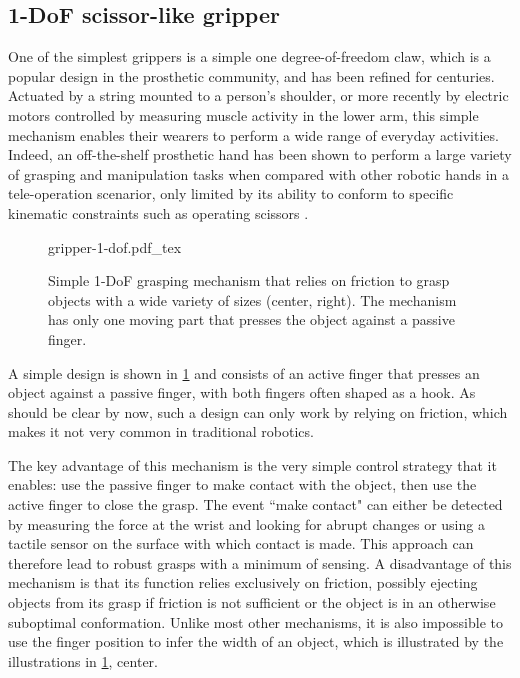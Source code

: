 \subsection{1-DoF scissor-like gripper}
One of the simplest grippers is a simple one degree-of-freedom claw, which is a popular design in the prosthetic community, and has been refined for centuries. Actuated by a string mounted to a person's shoulder, or more recently by electric motors controlled by measuring muscle activity in the lower arm, this simple mechanism enables their wearers to perform a wide range of everyday activities. Indeed, an off-the-shelf prosthetic hand has been shown to perform a large variety of grasping and manipulation tasks when compared with other robotic hands in a tele-operation scenarior, only limited by its ability to conform to specific kinematic constraints such as operating scissors \cite{patel2016manipulation}.

\begin{figure}
    \def\svgwidth{\textwidth}
    {gripper-1-dof.pdf_tex}
    \caption{Simple 1-DoF grasping mechanism that relies on friction to grasp objects with a wide variety of sizes (center, right). The mechanism has only one moving part that presses the object against a passive finger.}\label{fig:gripper-1-dof}
\end{figure}

A simple design is shown in \cref{fig:gripper-1-dof} and consists of an active finger that presses an object against a passive finger, with both fingers often shaped as a hook. As should be clear by now, such a design can only work by relying on friction, which makes it not very common in traditional robotics.

The key advantage of this mechanism is the very simple control strategy that it enables: use the passive finger to make contact with the object, then use the active finger to close the grasp. The event ``make contact" can either be detected by measuring the force at the wrist and looking for abrupt changes or using a tactile sensor on the surface with which contact is made. This approach can therefore lead to robust grasps with a minimum of sensing. A disadvantage of this mechanism is that its function relies exclusively on friction, possibly ejecting objects from its grasp if friction is not sufficient or the object is in an otherwise suboptimal conformation. Unlike most other mechanisms, it is also impossible to use the finger position to infer the width of an object, which is illustrated by the illustrations in \cref{fig:gripper-1-dof}, center.

